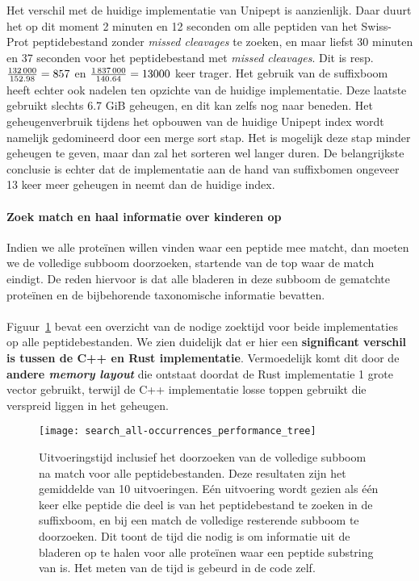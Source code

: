 Het verschil met de huidige implementatie van Unipept is aanzienlijk.
Daar duurt het op dit moment 2 minuten en 12 seconden om alle peptiden van het Swiss-Prot peptidebestand zonder \textit{missed cleavages} te zoeken,
en maar liefst 30 minuten en 37 seconden voor het peptidebestand met \textit{missed cleavages}.
Dit is resp.~$\frac{132\thinspace000}{152.98} = 857$ en $\frac{1\thinspace837\thinspace000}{140.64} = 13 000$ keer trager.
Het gebruik van de suffixboom heeft echter ook nadelen ten opzichte van de huidige implementatie.
Deze laatste gebruikt slechts 6.7 GiB geheugen, en dit kan zelfs nog naar beneden.
Het geheugenverbruik tijdens het opbouwen van de huidige Unipept index wordt namelijk gedomineerd door een merge sort stap.
Het is mogelijk deze stap minder geheugen te geven, maar dan zal het sorteren wel langer duren.
De belangrijkste conclusie is echter dat de implementatie aan de hand van suffixbomen ongeveer 13 keer meer geheugen in neemt dan de huidige index.

\paragraph{Zoek match en haal informatie over kinderen op}
Indien we alle proteïnen willen vinden waar een peptide mee matcht, dan moeten we de volledige subboom doorzoeken, startende van de top waar de match eindigt.
De reden hiervoor is dat alle bladeren in deze subboom de gematchte proteïnen en de bijbehorende taxonomische informatie bevatten.
\\ \\
Figuur~\ref{fig:performance_all-occurrences_tree} bevat een overzicht van de nodige zoektijd voor beide implementaties op alle peptidebestanden.
We zien duidelijk dat er hier een \textbf{significant verschil is tussen de C++ en Rust implementatie}.
Vermoedelijk komt dit door de \textbf{andere \textit{memory layout}} die ontstaat doordat de Rust implementatie 1 grote vector gebruikt, terwijl de C++ implementatie losse toppen gebruikt die verspreid liggen in het geheugen.

\begin{figure}[ht]
    \centering
    \texttt{[image: search\_all-occurrences\_performance\_tree]}
    \caption{Uitvoeringstijd inclusief het doorzoeken van de volledige subboom na match voor alle peptidebestanden. Deze resultaten zijn het gemiddelde van 10 uitvoeringen. Eén uitvoering wordt gezien als één keer elke peptide die deel is van het peptidebestand te zoeken in de suffixboom, en bij een match de volledige resterende subboom te doorzoeken. Dit toont de tijd die nodig is om informatie uit de bladeren op te halen voor alle proteïnen waar een peptide substring van is. Het meten van de tijd is gebeurd in de code zelf.}
    \label{fig:performance_all-occurrences_tree}
\end{figure}


